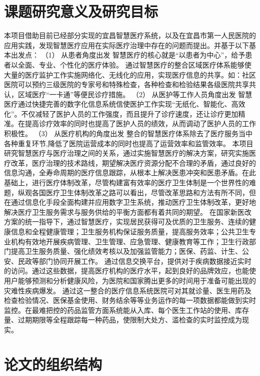 \documentclass[doctor,secret]{thuthesis}
\begin{document}
\section{课题研究意义及研究目标}
\label{sec:org4774b55}
本项目借助目前已经部分实现的宜昌智慧医疗系统，以及在宜昌市第一人民医院的应用实践，发现智慧医疗应用在实际医疗治理中存在的问题而提出。并基于以下基本出发点：
（1）	从患者角度出发
智慧医疗的核心就是“以患者为中心”，给予患者以全面、专业、个性化的医疗体验。
通过智慧医疗的整合区域医疗体系能够使大量的医疗监护工作实施网络化、无线化的应用，实现医疗信息的共享。如：社区医院可以预约三级医院的专家号和特殊检查，各种检查和检验结果各级医院共享共认，区域医疗“一卡通”等便民诊疗措施。
（2）	从医护等工作人员角度出发
智慧医疗通过快捷完善的数字化信息系统信使医护工作实现“无纸化、智能化、高效化”。不仅减轻了医护人员的工作强度，而且提升了诊疗速度，还让诊疗更加精准。在提高诊疗效率的同时也提高了医护人员的绩效，从而调动了医护人员的工作积极性。
（3）	从医疗机构的角度出发
整合的智慧医疗体系除去了医疗服务当中各种重复环节,降低了医院运营成本的同时也提高了运营效率和监管效率。
本项目研究智慧医疗与医疗治理之间的关系，通过实施智慧医疗的解决方案，研究实施医疗改革，医疗治理的技术路线，期望解决医疗资源分配不合理的矛盾，通过良好的信息沟通，全寿命周期的医疗信息跟踪，从根本上解决医患冲突和医患矛盾。在此基础上，进行医疗体制改革，尽管构建富有效率的医疗卫生体制是一个世界性的难题，纵观各国医疗卫生体制改革之路可以看出，尽管改革思路和方法有所不同，但在通过信息化手段全面构建并应用数字卫生系统，推动医疗卫生体制改革，更好地解决医疗卫生服务需求与服务供给的平衡方面都有着共同的期望。 
在国家新医改方案的统一指导下，通过智慧医疗，实现居民获得可及优质的卫生服务、连续的健康信息和全程健康管理；卫生服务机构保证服务质量，提高服务效率；公共卫生专业机构有效地开展疾病管理、卫生管理、应急管理、健康教育等工作；卫生行政部门提高卫生服务质量、强化绩效考核以及加强监管能力；医保、药监、计生、公安、民政等部门协同开展工作。
通过信息交换平台，提供对于疾病数据接近实时的访问。通过这些数据，提高医疗机构的医疗水平，起到良好的品牌效应，也能使用户能够预测和分析健康风险，为医院和国家腾出更多的时间用于准备可能出现的灾难性疾病爆发。
通过这一整合的医疗信息系统医院可对其就诊量、医生用药及检查检验情况、医保基金使用、财务结余等等业务运作的每一项数据都能做到实时监控。在最难把控的药品监管方面系统能从入库、每个医生工作站的使用、库存量、过期期限等全程跟踪每一种药品，使限制大处方、滥检查的实时监控成为现实。

\section{论文的组织结构}
\label{sec:org0d7967c}
\end{document}
